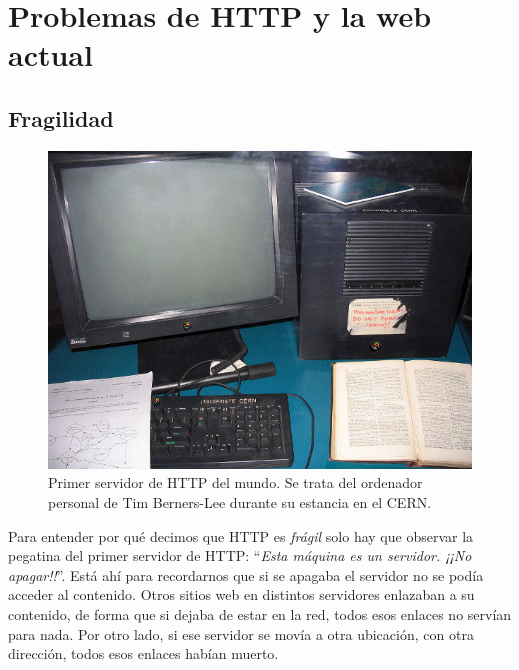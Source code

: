 \documentclass[12pt]{article} %
\begin{document}
\newpage



\section{Problemas de HTTP y la web actual} %
\label{sec:problemas_de_http}

\subsection{Fragilidad} %
\label{sub:fragilidad}

\begin{figure}[h]
\includegraphics[width=\textwidth]{first-web-server}
\caption{Primer servidor de HTTP del mundo. Se trata del ordenador personal de Tim Berners-Lee durante su estancia en el CERN.}
\end{figure}

Para entender por qué decimos que HTTP es \textit{frágil} solo hay que observar la pegatina del primer servidor de HTTP: ``\textit{Esta máquina es un servidor. ¡¡No apagar!!}''. Está ahí para recordarnos que si se apagaba el servidor no se podía acceder al contenido. Otros sitios web en distintos servidores enlazaban a su contenido, de forma que si dejaba de estar en la red, todos esos enlaces no servían para nada. Por otro lado, si ese servidor se movía a otra ubicación, con otra dirección, todos esos enlaces habían muerto.
\end{document}
